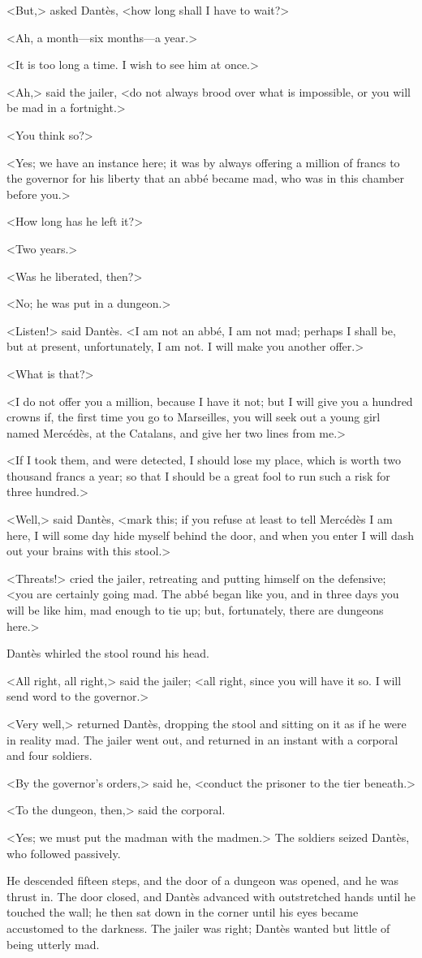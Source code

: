  <But,> asked Dantès, <how long shall I have to wait?> 

 <Ah, a month—six months—a year.> 

 <It is too long a time. I wish to see him at once.> 

 <Ah,> said the jailer, <do not always brood over what is impossible, or you will be mad in a fortnight.> 

 <You think so?> 

 <Yes; we have an instance here; it was by always offering a million of francs to the governor for his liberty that an abbé became mad, who was in this chamber before you.>

<How long has he left it?> 

 <Two years.> 

 <Was he liberated, then?> 

 <No; he was put in a dungeon.> 

 <Listen!> said Dantès. <I am not an abbé, I am not mad; perhaps I shall be, but at present, unfortunately, I am not. I will make you another offer.> 

 <What is that?> 

 <I do not offer you a million, because I have it not; but I will give you a hundred crowns if, the first time you go to Marseilles, you will seek out a young girl named Mercédès, at the Catalans, and give her two lines from me.>

<If I took them, and were detected, I should lose my place, which is worth two thousand francs a year; so that I should be a great fool to run such a risk for three hundred.> 

 <Well,> said Dantès, <mark this; if you refuse at least to tell Mercédès I am here, I will some day hide myself behind the door, and when you enter I will dash out your brains with this stool.> 

 <Threats!> cried the jailer, retreating and putting himself on the defensive; <you are certainly going mad. The abbé began like you, and in three days you will be like him, mad enough to tie up; but, fortunately, there are dungeons here.> 

 Dantès whirled the stool round his head. 

 <All right, all right,> said the jailer; <all right, since you will have it so. I will send word to the governor.> 

 <Very well,> returned Dantès, dropping the stool and sitting on it as if he were in reality mad. The jailer went out, and returned in an instant with a corporal and four soldiers. 

 <By the governor's orders,> said he, <conduct the prisoner to the tier beneath.> 

 <To the dungeon, then,> said the corporal. 

 <Yes; we must put the madman with the madmen.> The soldiers seized Dantès, who followed passively. 

 He descended fifteen steps, and the door of a dungeon was opened, and he was thrust in. The door closed, and Dantès advanced with outstretched hands until he touched the wall; he then sat down in the corner until his eyes became accustomed to the darkness. The jailer was right; Dantès wanted but little of being utterly mad. 